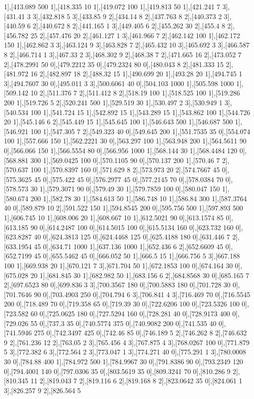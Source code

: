 {1],[413.089 500 1],[418.335 10 1],[419.072 100 1],[419.813 50 1],[421.241 7 3],[431.41 3 3],[432.818 5 3],[433.85 9 2],[434.14 8 2],[437.763 8 2],[440.373 2 3],[440.59 6 2],[440.672 8 2],[441.165 1 3],[449.405 6 2],[455.262 30 2],[455.4 8 2],[456.782 25 2],[457.476 20 2],[461.127 1 3],[461.966 7 2],[462.142 100 1],[462.172 150 1],[462.862 3 3],[463.124 9 3],[463.828 7 2],[465.432 10 3],[465.692 3 3],[466.587 8 2],[466.714 1 3],[467.33 2 3],[468.302 9 2],[468.38 7 2],[471.665 16 2],[473.052 7 2],[478.2991 50 0],[479.2212 35 0],[479.2324 80 0],[480.043 8 2],[481.333 15 2],[481.972 16 2],[482.897 18 2],[488.32 15 1],[490.699 20 1],[493.28 20 1],[494.745 1 3],[494.7607 30 0],[495.011 3 3],[500.6061 40 0],[504.103 1000 1],[505.598 1000 1],[509.142 10 2],[511.376 7 2],[511.412 8 2],[518.19 100 1],[518.525 100 1],[519.286 200 1],[519.726 5 2],[520.241 500 1],[529.519 30 1],[530.497 2 3],[530.949 1 3],[540.534 100 1],[541.724 15 1],[542.892 15 1],[543.289 15 1],[543.862 100 1],[544.726 20 1],[545.146 6 2],[545.449 15 1],[545.645 100 1],[546.643 500 1],[546.687 500 1],[546.921 100 1],[547.305 7 2],[549.323 40 0],[549.645 200 1],[551.7535 35 0],[554.074 100 1],[557.666 150 1],[562.2221 30 0],[563.297 100 1],[563.948 200 1],[564.5611 90 0],[566.066 150 1],[566.5554 80 0],[566.956 1000 1],[568.144 30 1],[568.4484 120 0],[568.881 300 1],[569.0425 100 0],[570.1105 90 0],[570.137 200 1],[570.46 7 2],[570.637 100 1],[570.8397 160 0],[571.629 8 2],[573.973 20 2],[574.7667 45 0],[575.3625 45 0],[575.422 45 0],[576.2977 45 0],[577.2145 70 0],[578.0384 70 0],[578.573 30 1],[579.3071 90 0],[579.49 30 1],[579.7859 100 0],[580.047 150 1],[580.674 200 1],[582.78 30 1],[584.613 50 1],[586.748 10 1],[586.84 300 1],[587.3764 40 0],[589.879 10 2],[591.522 150 1],[594.8545 200 0],[595.756 500 1],[597.893 500 1],[606.745 10 1],[608.006 20 1],[608.667 10 1],[612.5021 90 0],[613.1574 85 0],[613.185 90 0],[614.2487 100 0],[614.5015 100 0],[615.5134 160 0],[623.732 160 0],[623.8287 40 0],[624.3813 125 0],[624.4468 125 0],[625.4188 180 0],[631.446 7 2],[633.1954 45 0],[634.71 1000 1],[637.136 1000 1],[652.436 6 2],[652.6609 45 0],[652.7199 45 0],[655.5462 45 0],[666.052 50 1],[666.5 15 1],[666.756 5 3],[667.188 100 1],[669.938 20 1],[670.121 7 3],[671.704 50 1],[672.1853 100 0],[674.164 30 0],[675.028 20 1],[681.845 30 1],[682.982 50 1],[683.156 6 2],[684.8568 30 0],[685.165 7 2],[697.6523 80 0],[699.836 3 3],[700.3567 180 0],[700.5883 180 0],[701.728 30 0],[701.7646 90 0],[703.4903 250 0],[704.794 6 3],[706.841 4 3],[716.469 70 0],[716.5545 200 0],[718.489 70 0],[719.358 65 0],[719.39 30 0],[722.6206 100 0],[723.5326 100 0],[723.582 60 0],[725.0625 180 0],[727.5294 160 0],[728.281 40 0],[728.9173 400 0],[729.026 55 0],[737.3 35 0],[740.5774 375 0],[740.9082 200 0],[741.535 40 0],[741.5946 275 0],[742.3497 425 0],[742.46 85 0],[746.189 5 2],[746.262 8 2],[746.632 9 2],[761.236 12 2],[763.05 2 3],[765.456 4 3],[767.875 4 3],[768.0267 100 0],[771.879 5 3],[772.382 6 3],[772.564 2 3],[773.047 1 3],[774.271 40 0],[775.291 1 3],[780.0008 30 0],[784.88 400 1],[784.972 500 1],[784.9967 30 0],[791.8386 90 0],[793.2349 120 0],[794.4001 140 0],[797.0306 35 0],[803.5619 35 0],[809.3241 70 0],[810.286 9 2],[810.345 11 2],[819.043 7 2],[819.116 6 2],[819.168 8 2],[823.0642 35 0],[824.061 1 3],[826.257 9 2],[826.564 5 }
